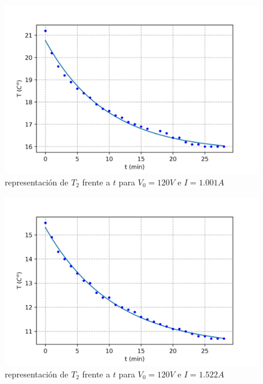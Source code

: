 \documentclass[12pt,a4paper]{article}
\begin{document}
\begin{figure}[h!] 	 \centering 
\includegraphics[scale=1.0]{plot-peltier1.png} 
\caption{representación de $T_2$ frente a $t$ para $V_0 = 120 V$ e $I = 1.001 A$} 
\label{Fig:graficapeltier2}
\end{figure} 

\begin{figure}[h!] 	 \centering 
\includegraphics[scale=1.0]{plot-peltier2.png} 
\caption{representación de $T_2$ frente a $t$ para $V_0 = 120 V$ e $I = 1.522 A$} 
\label{Fig:graficapeltier3}
\end{figure} 
\end{document}
